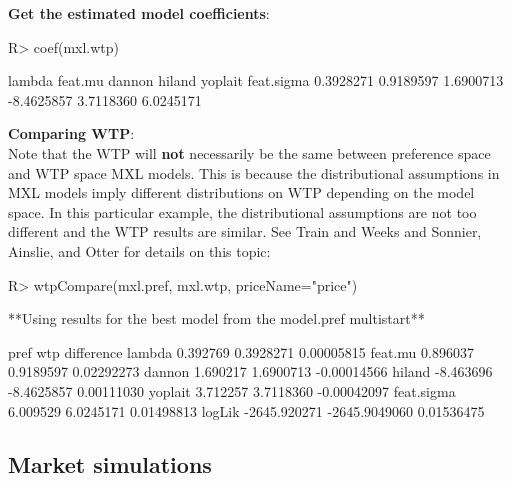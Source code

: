 \documentclass[article]{jss}
\begin{document}
\textbf{Get the estimated model coefficients}:

\begin{CodeChunk}

\begin{CodeInput}
R> coef(mxl.wtp)
\end{CodeInput}

\begin{CodeOutput}
    lambda    feat.mu     dannon     hiland    yoplait feat.sigma 
 0.3928271  0.9189597  1.6900713 -8.4625857  3.7118360  6.0245171 
\end{CodeOutput}
\end{CodeChunk}

\textbf{Comparing WTP}:\\
Note that the WTP will \textbf{not} necessarily be the same between
preference space and WTP space MXL models. This is because the
distributional assumptions in MXL models imply different distributions
on WTP depending on the model space. In this particular example, the
distributional assumptions are not too different and the WTP results are
similar. See Train and Weeks \citeyearpar{Train2005} and Sonnier,
Ainslie, and Otter \citeyearpar{Sonnier2007} for details on this topic:

\begin{CodeChunk}

\begin{CodeInput}
R> wtpCompare(mxl.pref, mxl.wtp, priceName="price")
\end{CodeInput}

\begin{CodeOutput}
**Using results for the best model from the model.pref multistart**
\end{CodeOutput}

\begin{CodeOutput}
                   pref           wtp  difference
lambda         0.392769     0.3928271  0.00005815
feat.mu        0.896037     0.9189597  0.02292273
dannon         1.690217     1.6900713 -0.00014566
hiland        -8.463696    -8.4625857  0.00111030
yoplait        3.712257     3.7118360 -0.00042097
feat.sigma     6.009529     6.0245171  0.01498813
logLik     -2645.920271 -2645.9049060  0.01536475
\end{CodeOutput}
\end{CodeChunk}

\newpage

\hypertarget{market-simulations-1}{%
\subsection{Market simulations}\label{market-simulations-1}}
\end{document}
